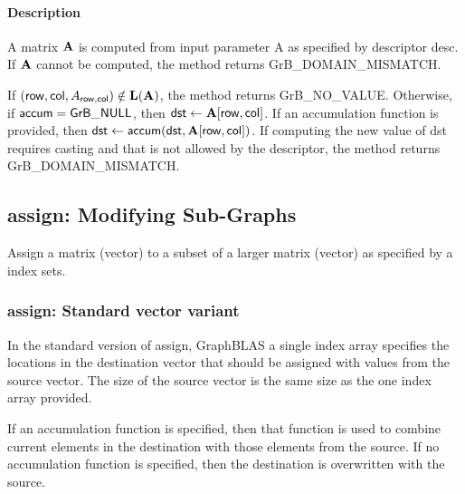 \paragraph{Description}

A matrix ${\bf A}$ is computed from input parameter {\sf A} as specified by descriptor {\sf desc}.
If ${\bf A}$ cannot be computed, the method returns {\sf GrB\_DOMAIN\_MISMATCH}.

If $({\sf row},{\sf col}, A_{{\sf row},{\sf col}}) \notin \bold{L}({\bf A})$, the method returns {\sf GrB\_NO\_VALUE}.
Otherwise, if ${\sf accum} = {\sf GrB\_NULL}$, then ${\sf dst} \leftarrow {\bf A}[{\sf row},{\sf col}]$.
If an accumulation function is provided, then ${\sf dst} \leftarrow {\sf accum}({\sf dst},{\bf A}[{\sf row},{\sf col}])$.
If computing the new value of {\sf dst} requires casting and that is not allowed by the descriptor,
the method returns {\sf GrB\_DOMAIN\_MISMATCH}.

\subsection{{\sf assign}: Modifying Sub-Graphs}

Assign a matrix (vector) to a subset  of a larger matrix (vector) as specified by a index sets.




\subsubsection{{\sf assign}: Standard vector variant}

In the standard version of {\sf assign}, GraphBLAS a single index array specifies
the locations in the destination vector that should be assigned with values
from the source vector.  The size of the source vector is the same size as the one
index array provided.

If an accumulation function is specified, then that function is used
to combine current elements in the destination with those elements
from the source.  If no accumulation function is specified, then the
destination is overwritten with the source.


